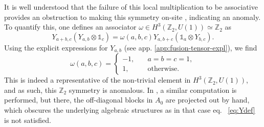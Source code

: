 \documentclass[prx, twocolumn, superscriptaddress, dvipsnames]{revtex4-2}
\theoremstyle{definition}
\begin{document}
It is well understood that the failure of this local multiplication to be associative provides an obstruction to making this symmetry on-site \cite{Seifnashri:2025vhf}, indicating an anomaly. To quantify this, one defines an associator $\omega \in H^3(\mathbb Z_2,U(1)) \simeq \mathbb Z_2$ as
\begin{equation}
    Y_{a+b,c} (Y_{a,b} \otimes \mathbb 1_c) = \omega(a,b,c) Y_{a,b+c} (\mathbb 1_a \otimes Y_{b,c}).
\end{equation}
Using the explicit expressions for $Y_{a,b}$ (see app. \ref{app:fusion-tensor-expl}), we find
\begin{equation}
    \omega(a,b,c) =
    \begin{cases}
        -1, \quad &a = b = c = 1,\\
        1, \quad &\text{otherwise}.
    \end{cases}
\end{equation}
This is indeed a representative of the non-trivial element in $H^3(\mathbb Z_2,U(1))$, and as such, this $\mathbb Z_2$ symmetry is anomalous. In \cite{chen2011two}, a similar computation is performed, but there, the off-diagonal blocks in $A_0$ are projected out by hand, which obscures the underlying algebraic structures as in that case eq. ~\eqref{eq:Ydef} is not satisfied.
\end{document}

